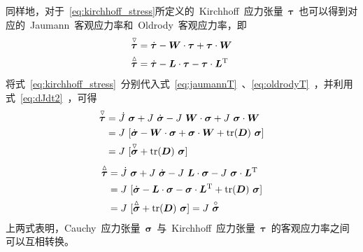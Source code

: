 同样地，对于~\eqref{eq:kirchhoff_stress}所定义的~Kirchhoff~应力张量~$\bm{\tau}$~也可以得到对应的~Jaumann~客观应力率和~Oldrody~客观应力率，即
\begin{align}
	\overset{\triangledown}{\bm{\tau}} & = \dot{\bm{\tau}} - \bm{W} \cdot \bm{\tau} + \bm{\tau} \cdot \bm{W} \label{eq:jaumannT} \\
	\overset{\vartriangle}{\bm{\tau}} & = \dot{\bm{\tau}} - \bm{L} \cdot \bm{\tau} - \bm{\tau} \cdot \bm{L}^{\mathrm{T}} \label{eq:oldrodyT}
\end{align}
将式~\eqref{eq:kirchhoff_stress}~分别代入式~\eqref{eq:jaumannT}~、\eqref{eq:oldrodyT}~，并利用式~\eqref{eq:dJdt2}~，可得
\begin{equation}\label{eq:dtaudt2}
\begin{split}
	  \overset{\triangledown}{\bm{\tau}} & = \dot{J}~\bm{\sigma} + J~\dot{\bm{\sigma}} - J~\bm{W} \cdot \bm{\sigma} + J~\bm{\sigma} \cdot \bm{W} \\
			    & = J~[\dot{\bm{\sigma}} - \bm{W} \cdot \bm{\sigma} + \bm{\sigma} \cdot \bm{W} + \operatorname{tr}(\bm{D})~\bm{\sigma}] \\
				& = J~[\overset{\triangledown}{\bm{\sigma}} + \operatorname{tr}(\bm{D})~\bm{\sigma}]
\end{split}
\end{equation}
\begin{equation}\label{eq:dtaudt3}
\begin{split}
	  \overset{\vartriangle}{\bm{\tau}} & = \dot{J}~\bm{\sigma} + J~\dot{\bm{\sigma}} - J~\bm{L} \cdot \bm{\sigma} - J~\bm{\sigma} \cdot \bm{L}^{\mathrm{T}} \\
			    & = J~[\dot{\bm{\sigma}} - \bm{L} \cdot \bm{\sigma} - \bm{\sigma} \cdot \bm{L}^{\mathrm{T}} + \operatorname{tr}(\bm{D})~\bm{\sigma}] \\
				& = J~[\overset{\vartriangle}{\bm{\sigma}} + \operatorname{tr}(\bm{D})~\bm{\sigma}] = J~\overset{\circ}{\bm{\sigma}}
\end{split}
\end{equation}
上两式表明，Cauchy~应力张量~$\bm{\sigma}$~与~Kirchhoff~应力张量~$\bm{\tau}$~的客观应力率之间可以互相转换。


